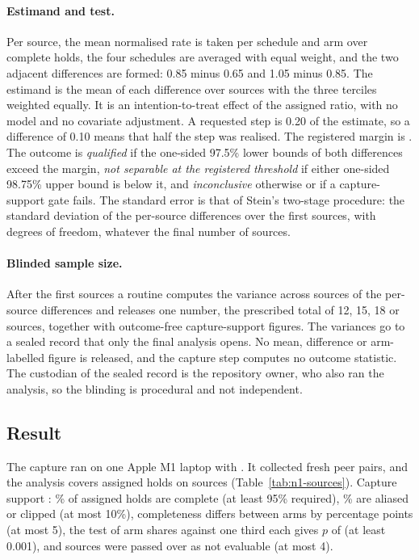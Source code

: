 \paragraph{Estimand and test.}
Per source, the mean normalised rate is taken per schedule and arm over complete holds, the four schedules are averaged with equal weight, and the two adjacent differences are formed: 0.85 minus 0.65 and 1.05 minus 0.85. The estimand is the mean of each difference over sources with the three terciles weighted equally. It is an intention-to-treat effect of the assigned ratio, with no model and no covariate adjustment. A requested step is 0.20 of the estimate, so a difference of 0.10 means that half the step was realised. The registered margin is \NOneMargin{}. The outcome is \emph{qualified} if the one-sided 97.5\% lower bounds of both differences exceed the margin, \emph{not separable at the registered threshold} if either one-sided 98.75\% upper bound is below it, and \emph{inconclusive} otherwise or if a capture-support gate fails. The standard error is that of Stein's two-stage procedure: the standard deviation of the per-source differences over the first \NOneFirstStage{} sources, with \NOneDegrees{} degrees of freedom, whatever the final number of sources.

\paragraph{Blinded sample size.}
After the first \NOneFirstStage{} sources a routine computes the variance across sources of the per-source differences and releases one number, the prescribed total of 12, 15, 18 or \NOneMaximum{} sources, together with outcome-free capture-support figures. The variances go to a sealed record that only the final analysis opens. No mean, difference or arm-labelled figure is released, and the capture step computes no outcome statistic. The custodian of the sealed record is the repository owner, who also ran the analysis, so the blinding is procedural and not independent.

\subsection{Result}
The capture ran on one Apple M1 laptop with \NOneBrowser{}. It collected \NOnePeers{} fresh peer pairs, and the analysis covers \NOneCohorts{} assigned holds on \NOneSources{} sources (Table~\ref{tab:n1-sources}). \NOneInterimSentence{} Capture support \NOneSupport{}: \NOneComplete\% of assigned holds are complete (at least 95\% required), \NOneAlias\% are aliased or clipped (at most 10\%), completeness differs between arms by \NOneGap{} percentage points (at most 5), the test of arm shares against one third each gives $p$ of \NOneArmP{} (at least 0.001), and \NOneSkipped{} sources were passed over as not evaluable (at most 4).

